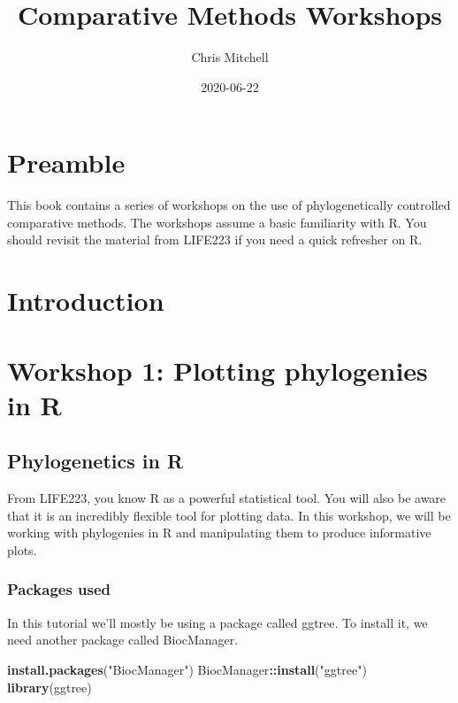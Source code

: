 \documentclass[]{book}
\title{Comparative Methods Workshops}
\author{Chris Mitchell}
\date{2020-06-22}
\newenvironment{Shaded}{\begin{snugshade}}{\end{snugshade}}
\newcommand{\KeywordTok}[1]{\textcolor[rgb]{0.13,0.29,0.53}{\textbf{#1}}}
\newcommand{\StringTok}[1]{\textcolor[rgb]{0.31,0.60,0.02}{#1}}
\newcommand{\OperatorTok}[1]{\textcolor[rgb]{0.81,0.36,0.00}{\textbf{#1}}}
\newcommand{\NormalTok}[1]{#1}
\begin{document}
\maketitle

{
\setcounter{tocdepth}{1}
\tableofcontents
}
\chapter{Preamble}\label{preamble}

This book contains a series of workshops on the use of phylogenetically
controlled comparative methods. The workshops assume a basic familiarity
with R. You should revisit the material from LIFE223 if you need a quick
refresher on R.

\chapter{Introduction}\label{intro}

\chapter{Workshop 1: Plotting phylogenies in R}\label{w1plotting}

\section{Phylogenetics in R}\label{phylogenetics-in-r}

From LIFE223, you know R as a powerful statistical tool. You will also
be aware that it is an incredibly flexible tool for plotting data. In
this workshop, we will be working with phylogenies in R and manipulating
them to produce informative plots.

\subsection{Packages used}\label{packages-used}

In this tutorial we'll mostly be using a package called ggtree. To
install it, we need another package called BiocManager.

\begin{Shaded}
\begin{Highlighting}[]
\KeywordTok{install.packages}\NormalTok{(}\StringTok{"BiocManager"}\NormalTok{)}
\NormalTok{BiocManager}\OperatorTok{::}\KeywordTok{install}\NormalTok{(}\StringTok{"ggtree"}\NormalTok{)}
\KeywordTok{library}\NormalTok{(ggtree)}
\end{Highlighting}
\end{Shaded}
\end{document}
